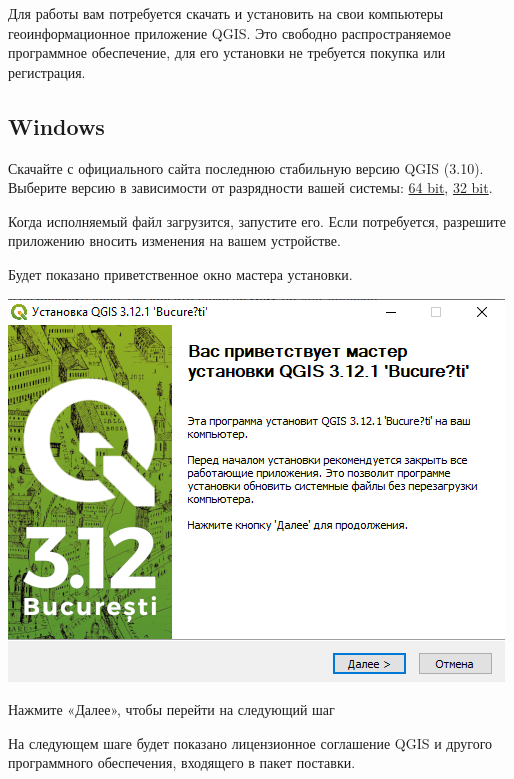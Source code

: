 \documentclass[
  12pt,
]{book}
\begin{document}
Для работы вам потребуется скачать и установить на свои компьютеры геоинформационное приложение QGIS. Это свободно распространяемое программное обеспечение, для его установки не требуется покупка или регистрация.

\hypertarget{windows}{%
\subsection*{Windows}\label{windows}}

Скачайте с официального сайта последнюю стабильную версию QGIS (3.10). Выберите версию в зависимости от разрядности вашей системы: \href{https://qgis.org/downloads/QGIS-OSGeo4W-3.10.3-3-Setup-x86_64.exe}{64 bit}, \href{https://qgis.org/downloads/QGIS-OSGeo4W-3.10.3-3-Setup-x86.exe}{32 bit}.

Когда исполняемый файл загрузится, запустите его. Если потребуется, разрешите приложению вносить изменения на вашем устройстве.

Будет показано приветственное окно мастера установки.

\includegraphics{images/installation_instruction_win/win01.png}

Нажмите «Далее», чтобы перейти на следующий шаг

На следующем шаге будет показано лицензионное соглашение QGIS и другого программного обеспечения, входящего в пакет поставки.
\end{document}
